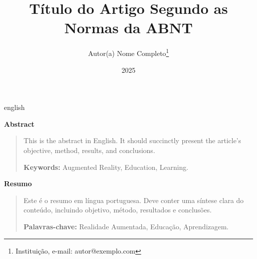 \documentclass[12pt,oneside]{article}
\title{Título do Artigo Segundo as Normas da ABNT}
\author{Autor(a) Nome Completo\thanks{Instituição, e-mail: autor@exemplo.com}}
\date{2025}
\newenvironment{resumoEng}{%
  \par\vspace{1em}%
  \begin{center}\bfseries Abstract\end{center}%
  \begin{quotation}%
}{\end{quotation}}
\newenvironment{resumoPort}{%
  \par\vspace{1em}%
  \begin{center}\bfseries Resumo\end{center}%
  \begin{quotation}%
}{\end{quotation}}
\begin{document}
\maketitle

\begin{otherlanguage*}{english}
\begin{resumoEng}
This is the abstract in English. It should succinctly present the article’s
objective, method, results, and conclusions.

\textbf{Keywords:} Augmented Reality, Education, Learning.
\end{resumoEng}
\end{otherlanguage*}

\begin{resumoPort}
Este é o resumo em língua portuguesa. Deve conter uma síntese clara do conteúdo,
incluindo objetivo, método, resultados e conclusões.

\textbf{Palavras-chave:} Realidade Aumentada, Educação, Aprendizagem.
\end{resumoPort}













\printbibliography

\appendix
\renewcommand{\thesection}{Apêndice \Alph{section}}


\end{document}
